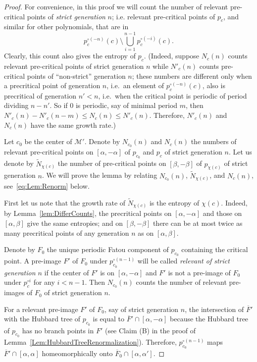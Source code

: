 \documentclass[12pt]{amsart}
\newcommand{\M}{\mathscr M}
\newcommand{\sm}{\setminus}
\newcommand{\0}{\texttt{0}}
\newcommand{\1}{\texttt{1}}
\theoremstyle{definition}
\numberwithin{equation}{section}
\newcommand{\ovl}[1]{\overline{#1}}
\begin{document}
\begin{proof}
For convenience, in this proof we will count the number of relevant pre-critical points of \emph{strict generation} $n$; i.e. relevant pre-critical points of $p_c$, and similar for other polynomials, that are in 
\[p_c^{\circ (-n)}(c)\sm \bigcup _{i=1}^{n-1}p_c^{\circ (-i)}(c).\]
Clearly, this count also gives the entropy of $p_c$. (Indeed, suppose $N_c(n)$ counts relevant pre-critical points of strict generation $n$ while $N'_c(n)$ counts  pre-critical points of ``non-strict'' generation $n$; these numbers are different only when a precritical point of generation $n$, i.e.\ an element of $p_c^{\circ (-n)}(c)$, also is precritical of generation $n'<n$, i.e.\ when the critical point is periodic of period dividing $n-n'$. So if $0$ is periodic, say of minimal period $m$, then $N'_c(n) -N'_c(n-m) \le N_c(n)\le N'_c(n)$. Therefore, $N'_c(n)$ and $N_c(n)$ have the same growth rate.)




Let $c_0$ be the center of $\M'$.  Denote by $N_{c_0}(n)$ and $N_c(n)$ the numbers of relevant pre-critical points on $[\alpha,-\alpha]$ of $p_{c_0}$ and $p_c$  of strict generation $n$. Let us denote by $\tilde N_{\chi(c)}$ the number of pre-critical points on $[\beta,-\beta]$ of $p_{\chi(c)}$ of strict generation $n$.  We will prove the lemma by relating $N_{c_0}(n)$, $\tilde N_{\chi(c)}$, and $N_c(n)$, see~\eqref{eq:Lem:Renorm} below.

First let us note that the growth rate of $\tilde N_{\chi(c)}$ is the entropy of $\chi(c)$. Indeed, by Lemma~\ref{lem:DifferCounts}, the precritical points on $[\alpha,-\alpha]$ and those on $[\alpha,\beta]$ give the same entropies; and on $[\beta,-\beta]$ there can be at most twice as many precritical points of any generation $n$ as on $[\alpha,\beta]$. 

Denote by $F_0$ the unique periodic Fatou component of $p_{c_0}$ containing the critical point. A pre-image $F'$ of $F_0$ under $p_{c_0}^{\circ(n-1)}$ will be called \emph{relevant of strict generation $n$} if the center of $F'$ is on $[\alpha,-\alpha]$ and $F'$ is not a pre-image of $F_0$ under $p_c^{\circ i}$ for any $i<n-1$. Then $N_{c_0}(n)$ counts the number of relevant pre-images of $F_0$ of strict generation $n$.

 For a relevant pre-image $F'$ of $F_0$, say of strict generation $n$, the intersection of $\ovl F'$ with the Hubbard tree of $p_{c_0}$ is equal to $\ovl F'\cap [\alpha,-\alpha]$ because the Hubbard tree of $p_{c_0}$ has no branch points in $F'$ (see Claim (B) in the proof of Lemma~\ref{Lem:HubbardTreeRenormalization}). Therefore,  $p_{c_0}^{\circ(n-1)}$ maps $\overline F'\cap [\alpha,\alpha]$ homeomorphically onto $\overline F_0\cap [\alpha,\alpha']$.


\end{proof}
\end{document}
